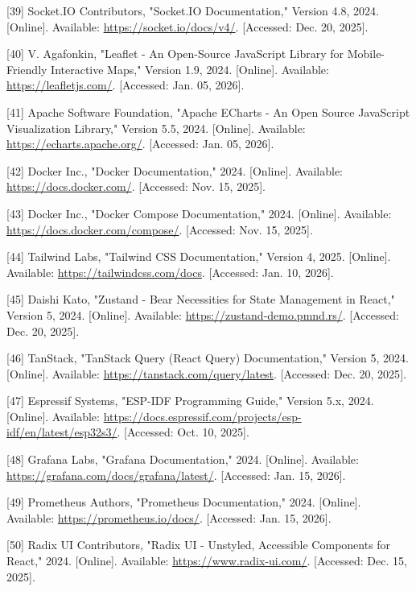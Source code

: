 \documentclass[a4paper]{extarticle}
\begin{document}
{[}39{]} Socket.IO Contributors, "Socket.IO Documentation," Version 4.8,
2024. {[}Online{]}. Available: \url{https://socket.io/docs/v4/}.
{[}Accessed: Dec. 20, 2025{]}.

{[}40{]} V. Agafonkin, "Leaflet - An Open-Source JavaScript Library for
Mobile-Friendly Interactive Maps," Version 1.9, 2024. {[}Online{]}.
Available: \url{https://leafletjs.com/}. {[}Accessed: Jan. 05, 2026{]}.

{[}41{]} Apache Software Foundation, "Apache ECharts - An Open Source
JavaScript Visualization Library," Version 5.5, 2024. {[}Online{]}.
Available: \url{https://echarts.apache.org/}. {[}Accessed: Jan. 05,
2026{]}.

{[}42{]} Docker Inc., "Docker Documentation," 2024. {[}Online{]}.
Available: \url{https://docs.docker.com/}. {[}Accessed: Nov. 15,
2025{]}.

{[}43{]} Docker Inc., "Docker Compose Documentation," 2024.
{[}Online{]}. Available: \url{https://docs.docker.com/compose/}.
{[}Accessed: Nov. 15, 2025{]}.

{[}44{]} Tailwind Labs, "Tailwind CSS Documentation," Version 4, 2025.
{[}Online{]}. Available: \url{https://tailwindcss.com/docs}.
{[}Accessed: Jan. 10, 2026{]}.

{[}45{]} Daishi Kato, "Zustand - Bear Necessities for State Management
in React," Version 5, 2024. {[}Online{]}. Available:
\url{https://zustand-demo.pmnd.rs/}. {[}Accessed: Dec. 20, 2025{]}.

{[}46{]} TanStack, "TanStack Query (React Query) Documentation," Version
5, 2024. {[}Online{]}. Available:
\url{https://tanstack.com/query/latest}. {[}Accessed: Dec. 20, 2025{]}.

{[}47{]} Espressif Systems, "ESP-IDF Programming Guide," Version 5.x,
2024. {[}Online{]}. Available:
\url{https://docs.espressif.com/projects/esp-idf/en/latest/esp32s3/}.
{[}Accessed: Oct. 10, 2025{]}.

{[}48{]} Grafana Labs, "Grafana Documentation," 2024. {[}Online{]}.
Available: \url{https://grafana.com/docs/grafana/latest/}. {[}Accessed:
Jan. 15, 2026{]}.

{[}49{]} Prometheus Authors, "Prometheus Documentation," 2024.
{[}Online{]}. Available: \url{https://prometheus.io/docs/}. {[}Accessed:
Jan. 15, 2026{]}.

{[}50{]} Radix UI Contributors, "Radix UI - Unstyled, Accessible
Components for React," 2024. {[}Online{]}. Available:
\url{https://www.radix-ui.com/}. {[}Accessed: Dec. 15, 2025{]}.
\end{document}
